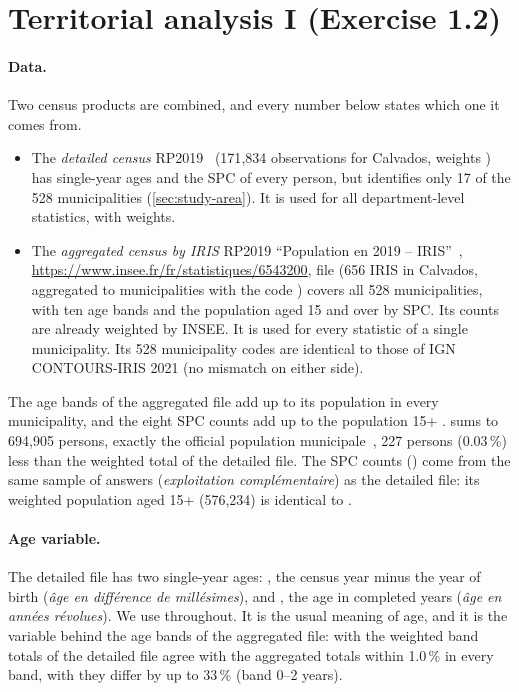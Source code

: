 \section{Territorial analysis I (Exercise 1.2)}\label{sec:territorial-I}

\paragraph{Data.}
Two census products are combined, and every number below states which one it comes from.
\begin{itemize}
  \item The \emph{detailed census} RP2019~\cite{insee-census-detailed} (171{,}834 observations for Calvados, weights
  ) has single-year ages and the SPC of every person, but identifies only 17 of the 528 municipalities
  (\cref{sec:study-area}). It is used for all department-level statistics, with weights.
  \item The \emph{aggregated census by IRIS} RP2019 ``Population en 2019 -- IRIS''~\cite{insee-census-aggregated},
  \url{https://www.insee.fr/fr/statistiques/6543200}, file 
  (656 IRIS in Calvados, aggregated to municipalities with the code
  ) covers all 528 municipalities, with ten age bands and the population aged 15 and over by SPC. Its counts
  are already weighted by INSEE. It is used for every statistic of a single municipality. Its 528 municipality codes
  are identical to those of IGN CONTOURS-IRIS 2021 (no mismatch on either side).
\end{itemize}
The age bands of the aggregated file add up to its population  in every municipality, and the eight SPC
counts add up to the population 15+ .  sums to 694{,}905 persons, exactly the official
population municipale~\cite{insee-popleg-2019}, 227 persons (0.03\,\%) less than the weighted total of the detailed
file. The SPC counts () come from the same sample of answers (\emph{exploitation compl\'ementaire}) as the
detailed file: its weighted population aged 15+ (576{,}234) is identical to .

\paragraph{Age variable.}
The detailed file has two single-year ages: , the census year minus the year of birth (\emph{\^age en
diff\'erence de mill\'esimes}), and , the age in completed years (\emph{\^age en ann\'ees r\'evolues}).
We use  throughout. It is the usual meaning of age, and it is the variable behind the age bands of the
aggregated file: with  the weighted band totals of the detailed file agree with the aggregated totals
within 1.0\,\% in every band, with  they differ by up to 33\,\% (band 0--2 years).

